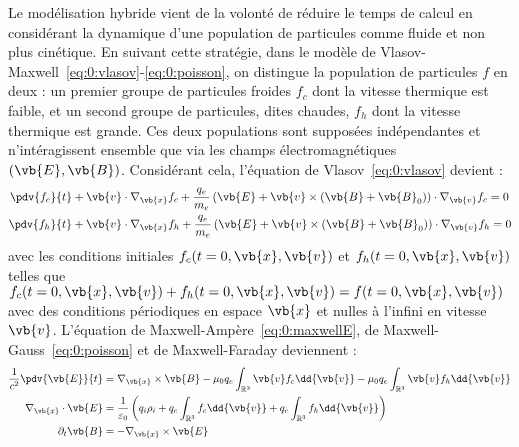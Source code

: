 Le modélisation hybride vient de la volonté de réduire le temps de calcul en considérant la dynamique d'une population de particules comme fluide et non plus cinétique. En suivant cette stratégie, dans le modèle de Vlasov-Maxwell~\eqref{eq:0:vlasov}-\eqref{eq:0:poisson}, on distingue la population de particules $f$ en deux : un premier groupe de particules froides $f_c$ dont la vitesse thermique est faible, et un second groupe de particules, dites chaudes, $f_h$ dont la vitesse thermique est grande. Ces deux populations sont supposées indépendantes et n'intéragissent ensemble que via les champs électromagnétiques $(\vb{E},\vb{B})$. Considérant cela, l'équation de Vlasov~\eqref{eq:0:vlasov} devient :
$$
  \begin{aligned}
    \pdv{f_c}{t} &+ \vb{v}\cdot\nabla_{\vb{x}} f_c + \frac{q_e}{m_e}\left( \vb{E} + \vb{v}\times(\vb{B}+\vb{B}_0) \right)\cdot\nabla_{\vb{v}} f_c = 0 \\
    \pdv{f_h}{t} &+ \vb{v}\cdot\nabla_{\vb{x}} f_h + \frac{q_e}{m_e}\left( \vb{E} + \vb{v}\times(\vb{B}+\vb{B}_0) \right)\cdot\nabla_{\vb{v}} f_h = 0
  \end{aligned}
$$
avec les conditions initiales $f_c(t=0,\vb{x},\vb{v})$ et $f_h(t=0,\vb{x},\vb{v})$ telles que $f_c(t=0,\vb{x},\vb{v})+f_h(t=0,\vb{x},\vb{v}) = f(t=0,\vb{x},\vb{v})$ avec des conditions périodiques en espace $\vb{x}$ et nulles à l'infini en vitesse $\vb{v}$. L'équation de Maxwell-Ampère~\eqref{eq:0:maxwellE}, de Maxwell-Gauss~\eqref{eq:0:poisson} et de Maxwell-Faraday deviennent :
$$
  \begin{aligned}
    \frac{1}{c^2}\pdv{\vb{E}}{t} &= \nabla_{\vb{x}}\times \vb{B} - \mu_0 q_e\int_{\mathbb{R}^3} \vb{v} f_c\dd{\vb{v}} - \mu_0 q_e\int_{\mathbb{R}^3} \vb{v} f_h\dd{\vb{v}} \\
    \nabla_{\vb{x}}\cdot\vb{E} &= \frac{1}{\varepsilon_0}\left( q_i\rho_i + q_e\int_{\mathbb{R}^3} f_c\dd{\vb{v}} + q_e\int_{\mathbb{R}^3} f_h\dd{\vb{v}} \right) \\
    \partial_t \vb{B} &= -\nabla_{\vb{x}}\times\vb{E}
  \end{aligned}
$$

